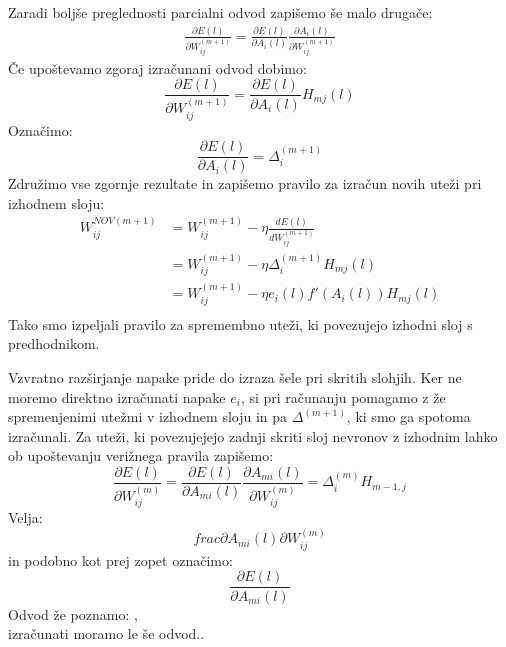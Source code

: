 \documentclass[mat1]{fmfdelo}
\begin{document}
Zaradi boljše preglednosti parcialni odvod zapišemo še malo drugače:
\begin{equation*}
\begin{aligned}
\frac{\partial E(l)}{\partial W^{(m+1)}_{ij}} = \frac{\partial E(l)}{\partial A_i(l)}\frac{\partial A_i(l)}{\partial W^{(m+1)}_{ij}} 
\end{aligned}
\end{equation*}
%
Če upoštevamo zgoraj izračunani odvod dobimo: 
%
\begin{equation*}
\frac{\partial E(l)}{\partial W^{(m+1)}_{ij}} = \frac{\partial E(l)}{\partial A_i(l)}H_{mj}(l) 
\end{equation*}
%
Označimo: 
%
\begin{equation*}
\frac{\partial E(l)}{\partial A_i(l)} = \Delta^{(m+1)}_i 
\end{equation*}
%
Združimo vse zgornje rezultate in zapišemo pravilo za izračun novih uteži pri izhodnem sloju:
%
\begin{equation}
\begin{aligned}
W^{NOV(m+1)}_{ij} &= W ^{(m+1)}_{ij}- \eta \frac{dE(l)}{dW_{ij}^{(m+1)}} \\
&= W ^{(m+1)}_{ij} -\eta  \Delta^{(m+1)}_i H_{mj}(l)\\
&= W ^{(m+1)}_{ij} -\eta e_i(l) f'(A_i(l))H_{mj}(l)\\
\end{aligned}
\end{equation}
%
Tako smo izpeljali pravilo za spremembno uteži, ki povezujejo izhodni sloj s predhodnikom. 

Vzvratno razširjanje napake pride do izraza šele pri skritih slohjih. Ker ne moremo direktno izračunati napake $e_i$, si pri računanju pomagamo z že spremenjenimi utežmi v izhodnem sloju in pa $\Delta^{(m+1)}$, ki smo ga spotoma izračunali. Za uteži, ki povezujejejo zadnji skriti sloj nevronov z izhodnim lahko ob upoštevanju verižnega pravila zapišemo:
%
\begin{equation*}
 \frac{\partial E(l)}{\partial W^{(m)}_{ij}} = \frac{\partial E(l)}{\partial A_{mi}(l)} \frac{\partial A_{mi}(l)}{\partial W^{(m)}_{ij}}
= \Delta^{(m)}_i H_{m-1,j}
\end{equation*}
%
Velja:
%
\begin{equation*}
frac{\partial A_{mi}(l)}{\partial W^{(m)}_{ij}}
\end{equation*}
%
in podobno kot prej zopet označimo:
%
\begin{equation*}
\frac{\partial E(l)}{\partial A_{mi}(l)}
\end{equation*}
%
Odvod %
že poznamo: ,
%
\begin{equation*}
\end{equation*}
%
izračunati moramo le še odvod..
%
\begin{equation*}
\end{equation*}
%
\end{document}
